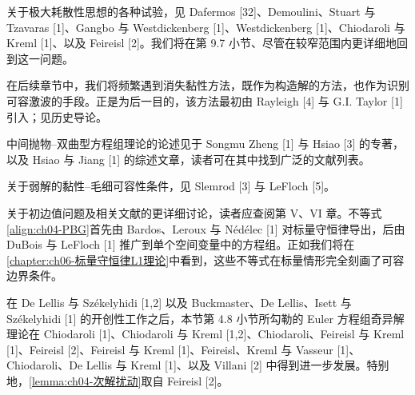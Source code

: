 ﻿\documentclass[../../main.tex]{subfiles}
\begin{document}
关于极大耗散性思想的各种试验，见 Dafermos [32]、Demoulini、Stuart 与 Tzavaras [1]、Gangbo 与 Westdickenberg [1]、Westdickenberg [1]、Chiodaroli 与 Kreml [1]、以及 Feireisl [2]。我们将在第 9.7 小节、尽管在较窄范围内更详细地回到这一问题。

在后续章节中，我们将频繁遇到消失黏性方法，既作为构造解的方法，也作为识别可容激波的手段。正是为后一目的，该方法最初由 Rayleigh [4] 与 G.I. Taylor [1] 引入；见历史导论。

中间抛物--双曲型方程组理论的论述见于 Songmu Zheng [1] 与 Hsiao [3] 的专著，以及 Hsiao 与 Jiang [1] 的综述文章，读者可在其中找到广泛的文献列表。

关于弱解的黏性--毛细可容性条件，见 Slemrod [3] 与 LeFloch [5]。

关于初边值问题及相关文献的更详细讨论，读者应查阅第 V、VI 章。不等式\eqref{align:ch04-PBG}首先由 Bardos、Leroux 与 Nédélec [1] 对标量守恒律导出，后由 DuBois 与 LeFloch [1] 推广到单个空间变量中的方程组。正如我们将在\cref{chapter:ch06-标量守恒律L1理论}中看到，这些不等式在标量情形完全刻画了可容边界条件。


在 De Lellis 与 Székelyhidi [1,2] 以及 Buckmaster、De Lellis、Isett 与 Székelyhidi [1] 的开创性工作之后，本节第 4.8 小节所勾勒的 Euler 方程组奇异解理论在 Chiodaroli [1]、Chiodaroli 与 Kreml [1,2]、Chiodaroli、Feireisl 与 Kreml [1]、Feireisl [2]、Feireisl 与 Kreml [1]、Feireisl、Kreml 与 Vasseur [1]、Chiodaroli、De Lellis 与 Kreml [1]、以及 Villani [2] 中得到进一步发展。特别地，\cref{lemma:ch04-次解扰动}取自 Feireisl [2]。
\end{document}
